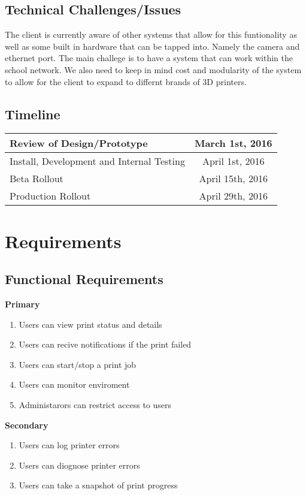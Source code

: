   \subsection{Technical Challenges/Issues}
  The client is currently aware of other systems that allow for this funtionality
  as well as some built in hardware that can be tapped into. Namely the camera and
  ethernet port. The main challege is to have a system that can work within the
  school network. We also need to keep in mind cost and modularity of the system to
  allow for the client to expand to differnt brands of 3D printers.

  \subsection{Timeline}
  \begin{center}
  \begin{tabular}{|l|c|}
    \hline
    Review of Design/Prototype & March 1st, 2016 \\
    \hline
    Install, Development and Internal Testing & April 1st, 2016 \\
    \hline
    Beta Rollout & April 15th, 2016 \\
    \hline
    Production Rollout & April 29th, 2016 \\
    \hline
  \end{tabular}
  \end{center}

  \section{Requirements}

  \subsection{Functional Requirements}
  \textbf{Primary}
  \begin{enumerate}
    \item{}Users can view print status and details
    \item{}Users can recive notifications if the print failed
    \item{}Users can start/stop a print job
    \item{}Users can monitor enviroment
    \item{}Administarors can restrict access to users
  \end{enumerate}
  \textbf{Secondary}
  \begin{enumerate}
    \item{}Users can log printer errors
    \item{}Users can diognose printer errors
    \item{}Users can take a snapshot of print progress
  \end{enumerate}
